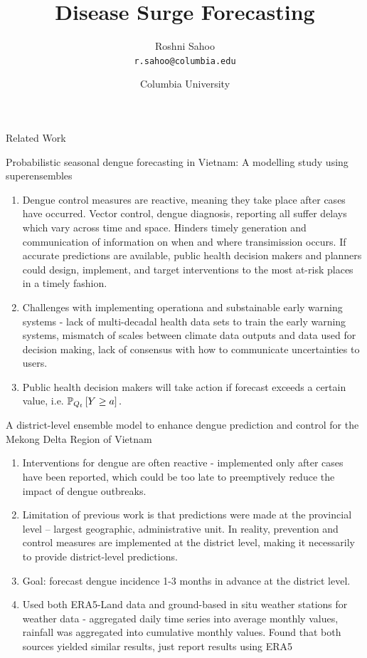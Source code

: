 \documentclass{article}
\author{Roshni Sahoo\\
  \texttt{r.sahoo@columbia.edu}
  }
\title{Disease Surge Forecasting}
\date{Columbia University}
\theoremstyle{definition}
\theoremstyle{plain}
\theoremstyle{remark}
\begin{document}
\maketitle

\begin{section}{Related Work}

\begin{subsection}{Probabilistic seasonal dengue forecasting in Vietnam: A modelling study using superensembles}
\citet{colon2021probabilistic}

\begin{enumerate}
  \item Dengue control measures are reactive, meaning they take place after cases have occurred. Vector control, dengue diagnosis, reporting all suffer delays which vary across time and space. Hinders timely generation and communication of information on when and where transimission occurs. If accurate predictions are available, public health decision makers and planners could design, implement, and target interventions to the most at-risk places in a timely fashion.
  \item Challenges with implementing operationa and substainable early warning systems - lack of multi-decadal health data sets to train the early warning systems, mismatch of scales between climate data outputs and data used for decision making, lack of consensus with how to communicate uncertainties to users.
  \item Public health decision makers will take action if forecast exceeds a certain value, i.e. $\PP[Q_{t}]{Y \geq a}.$
\end{enumerate}

\end{subsection}

\begin{subsection}{A district-level ensemble model to enhance dengue prediction and control for the Mekong Delta Region of Vietnam}
\citet{draidi2025district}

\begin{enumerate}
  \item Interventions for dengue are often reactive - implemented only after cases have been reported, which could be too late to preemptively reduce the impact of dengue outbreaks.
  \item Limitation of previous work is that predictions were made at the provincial level -- largest geographic, administrative unit. In reality, prevention and control measures are implemented at the district level, making it necessarily to provide district-level predictions.
  \item Goal: forecast dengue incidence 1-3 months in advance at the district level.
  \item Used both ERA5-Land data and ground-based in situ weather stations for weather data - aggregated daily time series into average monthly values, rainfall was aggregated into cumulative monthly values. Found that both sources yielded similar results, just report results using ERA5
\end{enumerate}


\end{subsection}
\end{section}
\end{document}
